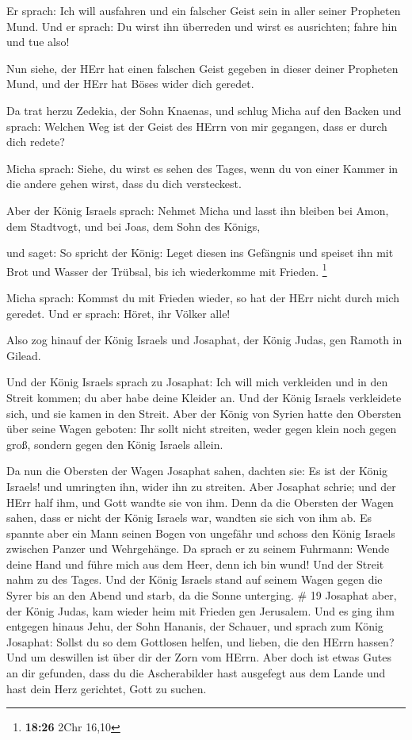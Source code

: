  Er sprach: Ich will ausfahren und ein falscher Geist sein
in aller seiner Propheten Mund. Und er sprach: Du wirst ihn überreden
und wirst es ausrichten; fahre hin und tue also!

 Nun siehe, der HErr hat einen falschen Geist gegeben in
dieser deiner Propheten Mund, und der HErr hat Böses wider dich geredet.

 Da trat herzu Zedekia, der Sohn Knaenas, und schlug Micha
auf den Backen und sprach: Welchen Weg ist der Geist des HErrn von mir
gegangen, dass er durch dich redete?

 Micha sprach: Siehe, du wirst es sehen des Tages, wenn du
von einer Kammer in die andere gehen wirst, dass du dich versteckest.

 Aber der König Israels sprach: Nehmet Micha und lasst ihn
bleiben bei Amon, dem Stadtvogt, und bei Joas, dem Sohn des Königs,

 und saget: So spricht der König: Leget diesen ins
Gefängnis und speiset ihn mit Brot und Wasser der Trübsal, bis ich
wiederkomme mit Frieden. \footnote{\textbf{18:26} 2Chr 16,10}

 Micha sprach: Kommst du mit Frieden wieder, so hat der
HErr nicht durch mich geredet. Und er sprach: Höret, ihr Völker alle!

 Also zog hinauf der König Israels und Josaphat, der König
Judas, gen Ramoth in Gilead.

 Und der König Israels sprach zu Josaphat: Ich will mich
verkleiden und in den Streit kommen; du aber habe deine Kleider an. Und
der König Israels verkleidete sich, und sie kamen in den Streit.
 Aber der König von Syrien hatte den Obersten über seine
Wagen geboten: Ihr sollt nicht streiten, weder gegen klein noch gegen
groß, sondern gegen den König Israels allein.

 Da nun die Obersten der Wagen Josaphat sahen, dachten sie:
Es ist der König Israels! und umringten ihn, wider ihn zu streiten. Aber
Josaphat schrie; und der HErr half ihm, und Gott wandte sie von ihm.
 Denn da die Obersten der Wagen sahen, dass er nicht der
König Israels war, wandten sie sich von ihm ab.  Es spannte
aber ein Mann seinen Bogen von ungefähr und schoss den König Israels
zwischen Panzer und Wehrgehänge. Da sprach er zu seinem Fuhrmann: Wende
deine Hand und führe mich aus dem Heer, denn ich bin wund! 
Und der Streit nahm zu des Tages. Und der König Israels stand auf seinem
Wagen gegen die Syrer bis an den Abend und starb, da die Sonne
unterging. \# 19  Josaphat aber, der König Judas, kam wieder
heim mit Frieden gen Jerusalem.  Und es ging ihm entgegen
hinaus Jehu, der Sohn Hananis, der Schauer, und sprach zum König
Josaphat: Sollst du so dem Gottlosen helfen, und lieben, die den HErrn
hassen? Und um deswillen ist über dir der Zorn vom HErrn. 
Aber doch ist etwas Gutes an dir gefunden, dass du die Ascherabilder
hast ausgefegt aus dem Lande und hast dein Herz gerichtet, Gott zu
suchen.


